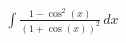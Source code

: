 \documentclass[preview]{standalone}
\begin{document}
\begin{align*}
\int \frac{1 - \cos^2(x)}{(1 + \cos(x))^2} \, dx
\end{align*}
\end{document}
